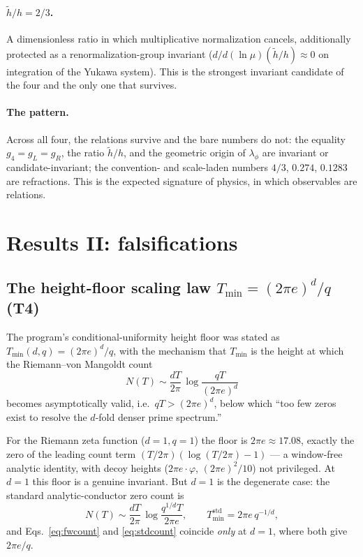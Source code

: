 \documentclass[11pt]{article}
\newcommand{\Tmin}{T_{\min}}
\begin{document}
\paragraph{$\tilde h/h=2/3$.} A dimensionless ratio in which multiplicative normalization
cancels, additionally protected as a renormalization-group invariant
($d/d(\ln\mu)(\tilde h/h)\approx0$ on integration of the Yukawa system). This is the
strongest invariant candidate of the four and the only one that survives.

\paragraph{The pattern.} Across all four, the relations survive and the bare numbers do
not: the equality $g_4=g_L=g_R$, the ratio $\tilde h/h$, and the geometric origin of
$\lambda_\phi$ are invariant or candidate-invariant; the convention- and scale-laden
numbers $4/3$, $0.274$, $0.1283$ are refractions. This is the expected signature of
physics, in which observables are relations.

\section{Results II: falsifications}

\subsection{The height-floor scaling law $\Tmin=(2\pi e)^d/q$ (T4)}
\label{sec:q3}

The program's conditional-uniformity height floor was stated as
$\Tmin(d,q)=(2\pi e)^d/q$, with the mechanism that $\Tmin$ is the height at which the
Riemann--von Mangoldt count
\begin{equation}
N(T)\sim \frac{dT}{2\pi}\,\log\!\frac{qT}{(2\pi e)^d}
\label{eq:fwcount}
\end{equation}
becomes asymptotically valid, i.e.\ $qT>(2\pi e)^d$, below which ``too few zeros exist
to resolve the $d$-fold denser prime spectrum.''

For the Riemann zeta function ($d=1,q=1$) the floor is $2\pi e\approx 17.08$, exactly
the zero of the leading count term $(T/2\pi)(\log(T/2\pi)-1)$ --- a window-free analytic
identity, with decoy heights ($2\pi e\cdot\varphi$, $(2\pi e)^2/10$) not privileged. At
$d=1$ this floor is a genuine invariant. But $d=1$ is the degenerate case: the standard
analytic-conductor zero count is
\begin{equation}
N(T)\sim \frac{dT}{2\pi}\,\log\!\frac{q^{1/d}T}{2\pi e},
\qquad
\Tmin^{\text{std}} = 2\pi e\, q^{-1/d},
\label{eq:stdcount}
\end{equation}
and Eqs.~\eqref{eq:fwcount} and \eqref{eq:stdcount} coincide \emph{only} at $d=1$, where
both give $2\pi e/q$.
\end{document}
